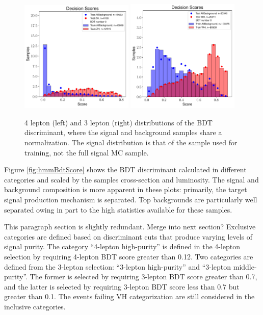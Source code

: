 \begin{figure}[htpb]
  \centering
  \includegraphics[width=0.48\textwidth]{figures/hmm/bdtHist/bar20-4lep-ZH-AllBackground-0-depth2-nEst80tag-new-AllBackground.pdf}
  \includegraphics[width=0.48\textwidth]{figures/hmm/bdtHist/bar20-3lep-WH-AllBackground-0-depth2-nEst50tag-new-AllBackground.pdf}
  \caption{4 lepton (left) and 3 lepton (right) distributions of the BDT discriminant, where the signal and background samples share a normalization. The signal distribution is that of the sample used for training, not the full signal MC sample.}
    \label{fig:hmmBdtScoreLin}
\end{figure}

Figure \ref{fig:hmmBdtScore} shows the BDT discriminant calculated in different categories and scaled by the samples cross-section and luminosity. The signal and background composition is more apparent in these plots: primarily, the target signal production mechanism is separated. Top backgrounds are particularly well separated owing in part to the high statistics available for these samples.

{\color{red} This paragraph section is slightly redundant. Merge into next section?}
Exclusive categories are defined based on discriminant cuts that produce varying levels of signal purity.
The category ``4-lepton high-purity'' is defined in the 4-lepton selection by requiring 4-lepton BDT score greater than 0.12. 
Two categories are defined from the 3-lepton selection: ``3-lepton high-purity'' and ``3-lepton middle-purity''. 
The former is selected by requiring 3-lepton BDT score greater than 0.7,
and the latter is selected by requiring 3-lepton BDT score less than 0.7
but greater than 0.1.
The events failing VH categorization are still considered in the inclusive categories.
 
